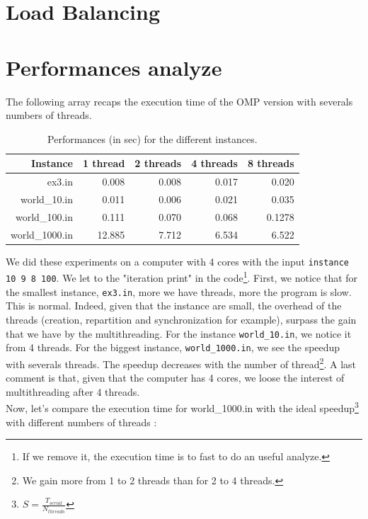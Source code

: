 \documentclass[a4paper,10pt]{article}
\begin{document}
\section*{Load Balancing}

\section*{Performances analyze}



The following array recaps the execution time of the OMP version with severals numbers of threads.
\begin{table}[!ht]
\centering
\begin{tabular}{|r||r|r|r|r|}
  \hline
    Instance     & 1 thread   & 2 threads   & 4 threads  & 8 threads  \\
  \hline
    ex3.in       &  0.008     & 0.008        & 0.017       &  0.020 \\ 
  \hline
    world\_10.in &  0.011      &  0.006       & 0.021       & 0.035 \\ 
  \hline
   world\_100.in &  0.111      & 0.070        & 0.068      & 0.1278 \\ 
  \hline
  world\_1000.in &  12.885   & 7.712       & 6.534      &  6.522 \\ 
  \hline
\end{tabular}
\caption{Performances (in sec) for the different instances.}
\end{table}

We did these experiments on a computer with 4 cores with the input \texttt{instance 10 9 8 100}. We
let to the "iteration print" in the code\footnote{If we remove it, the execution time is to fast to do an useful analyze.}.
First, we notice that for the smallest instance, \texttt{ex3.in},
more we have threads, more the program is slow. This is normal. Indeed, given that the instance are small, the overhead of the threads (creation, repartition and
synchronization for example), surpass the gain that we have by the multithreading.
For the instance \texttt{world\_10.in}, we notice it from 4 threads.
For the biggest instance, \texttt{world\_1000.in}, we see the speedup with severals threads. The speedup decreases with the number
of thread\footnote{We gain more from 1 to 2 threads than for 2 to 4 threads.}.
A last comment is that, given that the computer has 4 cores, we loose the interest of multithreading after 4 threads.
\\

Now, let's compare the execution time for  world\_1000.in with the ideal speedup\footnote{$S = \frac{T_{serial}}{N_{threads}}$}
with different numbers of threads :
\end{document}
